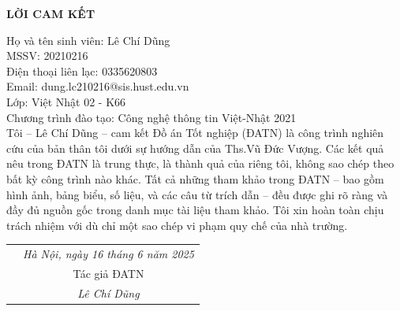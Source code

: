 \documentclass[../DoAn.tex]{subfiles}
\begin{document}
\hfill
\begin{center}
    \LARGE\textbf{LỜI CAM KẾT}\\
\end{center}
\vspace{1cm}
Họ và tên sinh viên: Lê Chí Dũng\\
MSSV: 20210216\\
Điện thoại liên lạc: 0335620803\\ Email: dung.lc210216@sis.hust.edu.vn\\
Lớp: Việt Nhật 02 - K66\\
Chương trình đào tạo: Công nghệ thông tin Việt-Nhật 2021 \\

\vspace{1cm}
Tôi – Lê Chí Dũng – cam kết Đồ án Tốt nghiệp (ĐATN) là công trình nghiên cứu của bản thân tôi dưới sự hướng dẫn của Ths.Vũ Đức Vượng. Các kết quả nêu trong ĐATN là trung thực, là thành quả của riêng tôi, không sao chép theo bất kỳ công trình nào khác. Tất cả những tham khảo trong ĐATN – bao gồm hình ảnh, bảng biểu, số liệu, và các câu từ trích dẫn – đều được ghi rõ ràng và đầy đủ nguồn gốc trong danh mục tài liệu tham khảo. Tôi xin hoàn toàn chịu trách nhiệm với dù chỉ một sao chép vi phạm quy chế của nhà trường.

\begin{table}[H]
\centering
\begin{tabular}{p{5cm} c}
\multicolumn{1}{c}{\textbf{}} &\emph{Hà Nội, ngày 16 \hspace{0.5cm} tháng 6\hspace{0.5cm}   năm 2025   }\vspace{0.4cm}\\
\textbf{}               & Tác giả ĐATN \vspace{3cm} \\

\textbf{}               & \emph{Lê Chí Dũng}
\end{tabular}
\end{table}
\end{document}
